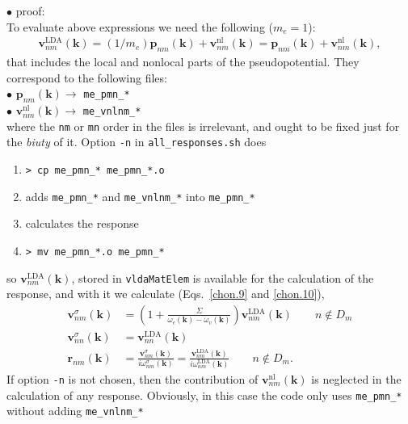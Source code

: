 $\bullet$ proof:\\
To evaluate above expressions we need the following ($m_e=1$):
\begin{align}\label{}
\mathbf{v}^\mathrm{LDA}_{nm}(\mathbf{k}) 
=(1/m_e)\mathbf{p}_{nm}(\mathbf{k})+\mathbf{v}^\mathrm{nl}_{nm}(\mathbf{k})
=\mathbf{p}_{nm}(\mathbf{k})+\mathbf{v}^\mathrm{nl}_{nm}(\mathbf{k})
,
\end{align}
that
 includes the local and nonlocal parts of the pseudopotential. They
 correspond to the following files:\\
$\bullet$ $\mathbf{p}_{nm}(\mathbf{k})\to$ \verb=me_pmn_*=\\
$\bullet$ $\mathbf{v}^\mathrm{nl}_{nm}(\mathbf{k})\to$ \verb=me_vnlnm_*=\\
where the \verb=nm= or \verb=mn= order in the files is irrelevant, and
ought to be fixed just for the \emph{biuty} of it.
Option \verb=-n= in \verb=all_responses.sh= does
\begin{enumerate}
\item 
 \verb=> cp me_pmn_* me_pmn_*.o= 
\item adds \verb=me_pmn_*= and \verb=me_vnlnm_*= into
  \verb=me_pmn_*= 
\item calculates the response
\item \verb=> mv me_pmn_*.o me_pmn_*=
\end{enumerate}
so   
$\mathbf{v}^\mathrm{LDA}_{nm}(\mathbf{k})$, stored in \verb=vldaMatElem=
is available for the calculation of the response, and with it we calculate
(Eqs.~\eqref{chon.9} and \eqref{chon.10}),
\begin{align}\label{c-chon.98}
\mathbf{v}^\sigma_{nm}(\mathbf{k})
&=
\left(1+\frac{\Sigma}{\omega_c(\mathbf{k})-\omega_v(\mathbf{k})}\right)\mathbf{v}^\mathrm{LDA}_{nm}(\mathbf{k})
\quad\quad n\notin D_m
\nonumber\\
\mathbf{v}^\sigma_{nn}(\mathbf{k})
&=
\mathbf{v}^\mathrm{LDA}_{nn}(\mathbf{k})
\nonumber\\
\mathbf{r}_{nm}(\mathbf{k})&=\frac{\mathbf{v}^\sigma_{nm}(\mathbf{k})}{i\omega^\sigma_{nm}(\mathbf{k})}
=\frac{\mathbf{v}^\mathrm{LDA}_{nm}(\mathbf{k})}{i\omega^\mathrm{LDA}_{nm}(\mathbf{k})}
\quad\quad n\notin D_m
.
\end{align}   
If option \verb=-n= is not chosen, then the contribution of $\mathbf{v}^\mathrm{nl}_{nm}(\mathbf{k})$
is neglected in the calculation of any response. Obviously, in this
case the code only uses \verb=me_pmn_*= without adding \verb=me_vnlnm_*= 

